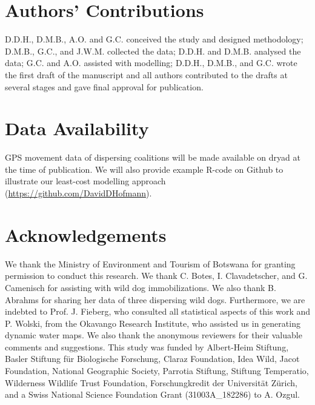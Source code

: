 \documentclass[abstract=on,10pt,a4paper,bibliography=totocnumbered]{article}
\begin{document}
\section{Authors' Contributions}
D.D.H., D.M.B., A.O. and G.C. conceived the study and designed methodology;
D.M.B., G.C., and J.W.M. collected the data; D.D.H. and D.M.B. analysed the
data; G.C. and A.O. assisted with modelling; D.D.H., D.M.B., and G.C. wrote the
first draft of the manuscript and all authors contributed to the drafts at
several stages and gave final approval for publication.

\section{Data Availability}
GPS movement data of dispersing coalitions will be made available on dryad at
the time of publication. We will also provide example R-code on Github to
illustrate our least-cost modelling approach
(\url{https://github.com/DavidDHofmann}).

\section{Acknowledgements}
We thank the Ministry of Environment and Tourism of Botswana for granting
permission to conduct this research. We thank C. Botes, I. Clavadetscher, and G.
Camenisch for assisting with wild dog immobilizations. We also thank B. Abrahms
for sharing her data of three dispersing wild dogs. Furthermore, we are indebted
to Prof. J. Fieberg, who consulted all statistical aspects of this work and P.
Wolski, from the Okavango Research Institute, who assisted us in generating
dynamic water maps. We also thank the anonymous reviewers for their valuable
comments and suggestions. This study was funded by Albert-Heim Stiftung, Basler
Stiftung für Biologische Forschung, Claraz Foundation, Idea Wild, Jacot
Foundation, National Geographic Society, Parrotia Stiftung, Stiftung Temperatio,
Wilderness Wildlife Trust Foundation, Forschungkredit der Universität Zürich,
and a Swiss National Science Foundation Grant (31003A\_182286) to A. Ozgul.

\newpage
\begingroup
\singlespacing

\endgroup
\end{document}
